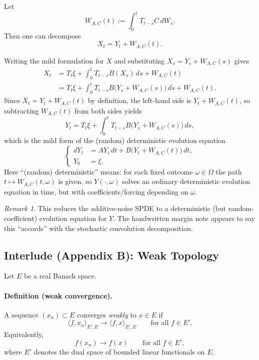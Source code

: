 \documentclass[11pt]{article}
\theoremstyle{definition}
\theoremstyle{remark}
\newtheorem{remark}{Remark}
\begin{document}
Let
\[
W_{A,C}(t) := \int_0^t T_{t-s}C\,dW_s.
\]
Then one can decompose
\[
X_t = Y_t + W_{A,C}(t).
\]

Writing the mild formulation for $X$ and substituting $X_s=Y_s+W_{A,C}(s)$ gives
\[
\begin{aligned}
X_t
&=
T_t\xi
+ \int_0^t T_{t-s}B(X_s)\,ds
+ W_{A,C}(t) \\
&=
T_t\xi
+ \int_0^t T_{t-s}B\bigl(Y_s+W_{A,C}(s)\bigr)\,ds
+ W_{A,C}(t).
\end{aligned}
\]
Since $X_t=Y_t+W_{A,C}(t)$ by definition, the left-hand side is $Y_t+W_{A,C}(t)$, so subtracting $W_{A,C}(t)$ from both sides yields
\[
Y_t
=
T_t\xi
+ \int_0^t T_{t-s}B\bigl(Y_s+W_{A,C}(s)\bigr)\,ds,
\]
which is the mild form of the (random) deterministic evolution equation
\[
\left\{
\begin{aligned}
dY_t &= AY_t\,dt + B\bigl(Y_t+W_{A,C}(t)\bigr)\,dt,\\
Y_0 &= \xi.
\end{aligned}
\right.
\]
\noindent
Here ``(random) deterministic'' means: for each fixed outcome $\omega\in\Omega$ the path $t\mapsto W_{A,C}(t,\omega)$ is given, so $Y(\cdot,\omega)$ solves an ordinary deterministic evolution equation in time, but with coefficients/forcing depending on $\omega$.

\begin{remark}
This reduces the additive-noise SPDE to a deterministic (but random-coefficient) evolution equation for $Y$. The handwritten margin note appears to say this ``accords'' with the stochastic convolution decomposition.
\end{remark}

\subsection*{Interlude (Appendix B): Weak Topology}

Let $E$ be a real Banach space.

\paragraph{Definition (weak convergence).}
A sequence $(x_n)\subset E$ converges \emph{weakly} to $x\in E$ if
\[
\langle f, x_n\rangle_{E',E} \longrightarrow \langle f, x\rangle_{E',E}
\qquad\text{for all } f\in E'.
\]
Equivalently,
\[
f(x_n)\to f(x)\qquad\text{for all } f\in E',
\]
where $E'$ denotes the dual space of bounded linear functionals on $E$.
\end{document}
